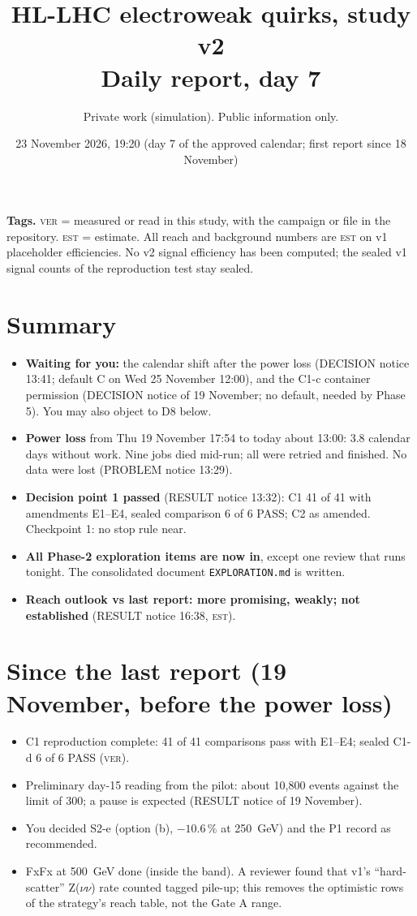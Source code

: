 \documentclass[11pt,a4paper]{article}
\title{HL-LHC electroweak quirks, study v2\\[2pt]\large Daily report, day 7}
\author{Private work (simulation). Public information only.}
\date{23 November 2026, 19:20 (day 7 of the approved calendar; first report since 18 November)}
\newcommand{\est}{\textsc{est}}
\newcommand{\ver}{\textsc{ver}}
\begin{document}
\maketitle

\noindent\textbf{Tags.} \ver{} = measured or read in this study, with the campaign or file in the repository.
\est{} = estimate. All reach and background numbers are \est{} on v1 placeholder efficiencies. No v2 signal
efficiency has been computed; the sealed v1 signal counts of the reproduction test stay sealed.

\section{Summary}
\begin{itemize}
\item \textbf{Waiting for you:} the calendar shift after the power loss (DECISION notice 13:41; default C on
      Wed 25 November 12:00), and the C1-c container permission (DECISION notice of 19 November; no default,
      needed by Phase 5). You may also object to D8 below.
\item \textbf{Power loss} from Thu 19 November 17:54 to today about 13:00: 3.8 calendar days without work. Nine jobs
      died mid-run; all were retried and finished. No data were lost (PROBLEM notice 13:29).
\item \textbf{Decision point 1 passed} (RESULT notice 13:32): C1 41 of 41 with amendments E1--E4, sealed comparison
      6 of 6 PASS; C2 as amended. Checkpoint 1: no stop rule near.
\item \textbf{All Phase-2 exploration items are now in}, except one review that runs tonight. The consolidated
      document \texttt{EXPLORATION.md} is written.
\item \textbf{Reach outlook vs last report: more promising, weakly; not established} (RESULT notice 16:38, \est).
\end{itemize}

\section{Since the last report (19 November, before the power loss)}
\begin{itemize}
\item C1 reproduction complete: 41 of 41 comparisons pass with E1--E4; sealed C1-d 6 of 6 PASS (\ver).
\item Preliminary day-15 reading from the pilot: about 10{,}800 events against the limit of 300; a pause is
      expected (RESULT notice of 19 November).
\item You decided S2-e (option (b), $-10.6\,\%$ at 250~GeV) and the P1 record as recommended.
\item FxFx at 500~GeV done (inside the band). A reviewer found that v1's ``hard-scatter'' Z($\nu\nu$) rate counted
      tagged pile-up; this removes the optimistic rows of the strategy's reach table, not the Gate A range.
\end{itemize}
\end{document}
